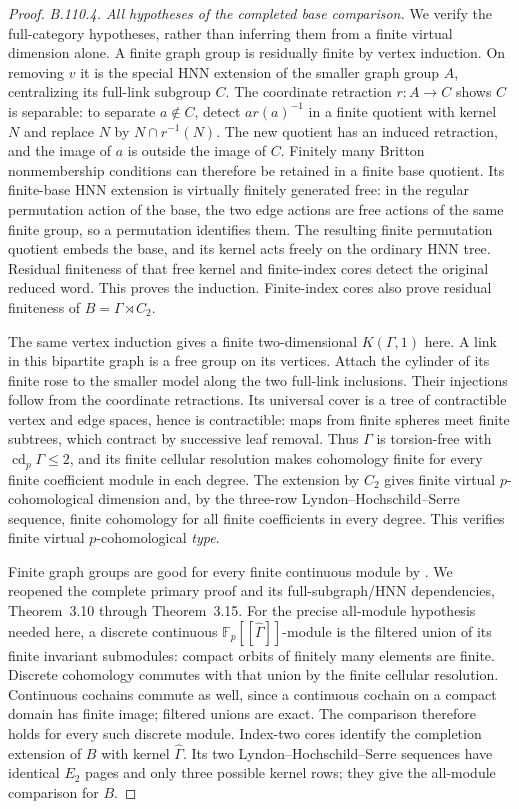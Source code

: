 \begin{proof}
\emph{B.110.4. All hypotheses of the completed base comparison.}
We verify the full-category hypotheses, rather than inferring them
from a finite virtual dimension alone. A finite graph group is
residually finite by vertex induction. On removing $v$ it is the
special HNN extension of the smaller graph group $A$, centralizing
its full-link subgroup $C$. The coordinate retraction $r:A\to C$
shows $C$ is separable: to separate $a\notin C$, detect
$ar(a)^{-1}$ in a finite quotient with kernel $N$ and replace $N$
by $N\cap r^{-1}(N)$. The new quotient has an induced retraction,
and the image of $a$ is outside the image of $C$. Finitely many
Britton nonmembership conditions can therefore be retained in a
finite base quotient. Its finite-base HNN extension is virtually
finitely generated free: in the regular permutation action of the
base, the two edge actions are free actions of the same finite
group, so a permutation identifies them. The resulting finite
permutation quotient embeds the base, and its kernel acts freely
on the ordinary HNN tree. Residual finiteness of that free kernel
and finite-index cores detect the original reduced word. This
proves the induction. Finite-index cores also prove residual
finiteness of $B=\Gamma\rtimes C_2$.

The same vertex induction gives a finite two-dimensional
$K(\Gamma,1)$ here. A link in this bipartite graph is a free group
on its vertices. Attach the cylinder of its finite rose to the
smaller model along the two full-link inclusions. Their injections
follow from the coordinate retractions. Its universal cover is a
tree of contractible vertex and edge spaces, hence is contractible:
maps from finite spheres meet finite subtrees, which contract by
successive leaf removal. Thus $\Gamma$ is torsion-free with
$\operatorname{cd}_p\Gamma\leq2$, and its finite cellular resolution
makes cohomology finite for every finite coefficient module in each
degree. The extension by $C_2$ gives finite virtual
$p$-cohomological dimension and, by the three-row
Lyndon--Hochschild--Serre sequence, finite cohomology for all finite
coefficients in every degree. This verifies finite virtual
$p$-cohomological \emph{type}.

Finite graph groups are good for every finite continuous module by
\citet[Theorem~3.15]{B_Lorensen2008}. We reopened the complete
primary proof and its full-subgraph/HNN dependencies, Theorem~3.10
through Theorem~3.15. For the precise all-module hypothesis needed
here, a discrete continuous $\mathbb F_p[[\widehat\Gamma]]$-module
is the filtered union of its finite invariant submodules: compact
orbits of finitely many elements are finite. Discrete cohomology
commutes with that union by the finite cellular resolution.
Continuous cochains commute as well, since a continuous cochain
on a compact domain has finite image; filtered unions are exact.
The comparison therefore holds for every such discrete module.
Index-two cores identify the completion extension of $B$ with
kernel $\widehat\Gamma$. Its two Lyndon--Hochschild--Serre sequences
have identical $E_2$ pages and only three possible kernel rows;
they give the all-module comparison for $B$.


\end{proof}
